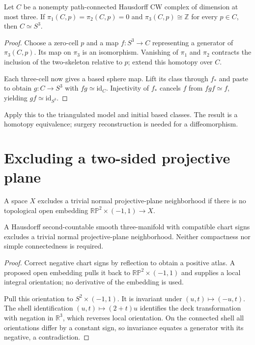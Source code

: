 \begin{proposition}
\label{prop:foundations-cw-equivalence}
Let $C$ be a nonempty path-connected Hausdorff CW complex of dimension
at most three. If $\pi_1(C,p)=\pi_2(C,p)=0$ and
$\pi_3(C,p)\cong\mathbb Z$ for every $p\in C$, then $C\simeq S^3$.
\end{proposition}
\begin{proof}
Choose a zero-cell $p$ and a map $f:S^3\to C$ representing a generator
of $\pi_3(C,p)$. Its map on $\pi_3$ is an isomorphism. Vanishing of
$\pi_1$ and $\pi_2$ contracts the inclusion of the two-skeleton
relative to $p$; extend this homotopy over $C$.

Each three-cell now gives a based sphere map. Lift its class through
$f_*$ and paste to obtain $g:C\to S^3$ with
$fg\simeq\mathrm{id}_C$. Injectivity of $f_*$ cancels $f$ from
$fgf\simeq f$, yielding $gf\simeq\mathrm{id}_{S^3}$.
\end{proof}

Apply this to the triangulated model and initial based classes. The
result is a homotopy equivalence; surgery reconstruction is needed for
a diffeomorphism.

\section{Excluding a two-sided projective plane}
\label{sec:foundations-projective-plane}

\begin{definition}
\label{def:foundations-projective-neighborhood}
A space $X$ excludes a trivial normal projective-plane neighborhood if
there is no topological open embedding $\mathbb{RP}^2\times(-1,1)\to X$.
\end{definition}

\begin{proposition}
\label{prop:foundations-projective-exclusion}
A Hausdorff second-countable smooth three-manifold with compatible
chart signs excludes a trivial normal projective-plane neighborhood.
Neither compactness nor simple connectedness is required.
\end{proposition}
\begin{proof}
Correct negative chart signs by reflection to obtain a positive atlas.
A proposed open embedding pulls it back to
$\mathbb{RP}^2\times(-1,1)$ and supplies a local integral orientation;
no derivative of the embedding is used.

Pull this orientation to $S^2\times(-1,1)$. It is invariant under
$(u,t)\mapsto(-u,t)$. The shell identification $(u,t)\mapsto(2+t)u$
identifies the deck transformation with negation in $\mathbb R^3$,
which reverses local orientation. On the connected shell all orientations
differ by a constant sign, so invariance equates a generator with its
negative, a contradiction.
\end{proof}

